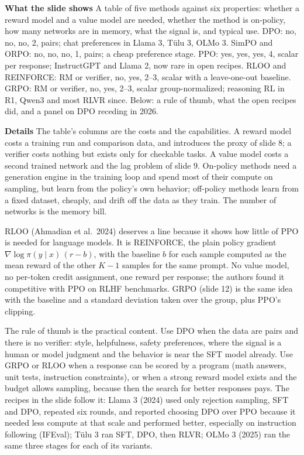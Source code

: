 \documentclass[11pt,letterpaper]{article}
\newcommand{\para}[1]{\medskip\noindent\textbf{#1}\quad}
\begin{document}
\para{What the slide shows} A table of five methods against six properties: whether a reward model and a value model are needed, whether the method is on-policy, how many networks are in memory, what the signal is, and typical use. DPO: no, no, no, 2, pairs; chat preferences in Llama 3, Tülu 3, OLMo 3. SimPO and ORPO: no, no, no, 1, pairs; a cheap preference stage. PPO: yes, yes, yes, 4, scalar per response; InstructGPT and Llama 2, now rare in open recipes. RLOO and REINFORCE: RM or verifier, no, yes, 2--3, scalar with a leave-one-out baseline. GRPO: RM or verifier, no, yes, 2--3, scalar group-normalized; reasoning RL in R1, Qwen3 and most RLVR since. Below: a rule of thumb, what the open recipes did, and a panel on DPO receding in 2026.

\para{Details} The table's columns are the costs and the capabilities. A reward model costs a training run and comparison data, and introduces the proxy of slide 8; a verifier costs nothing but exists only for checkable tasks. A value model costs a second trained network and the lag problem of slide 9. On-policy methods need a generation engine in the training loop and spend most of their compute on sampling, but learn from the policy's own behavior; off-policy methods learn from a fixed dataset, cheaply, and drift off the data as they train. The number of networks is the memory bill.

RLOO (Ahmadian et al.\ 2024) deserves a line because it shows how little of PPO is needed for language models. It is REINFORCE, the plain policy gradient $\nabla\log\pi(y\mid x)\,(r-b)$, with the baseline $b$ for each sample computed as the mean reward of the other $K-1$ samples for the same prompt. No value model, no per-token credit assignment, one reward per response; the authors found it competitive with PPO on RLHF benchmarks. GRPO (slide 12) is the same idea with the baseline and a standard deviation taken over the group, plus PPO's clipping.

The rule of thumb is the practical content. Use DPO when the data are pairs and there is no verifier: style, helpfulness, safety preferences, where the signal is a human or model judgment and the behavior is near the SFT model already. Use GRPO or RLOO when a response can be scored by a program (math answers, unit tests, instruction constraints), or when a strong reward model exists and the budget allows sampling, because then the search for better responses pays. The recipes in the slide follow it: Llama 3 (2024) used only rejection sampling, SFT and DPO, repeated six rounds, and reported choosing DPO over PPO because it needed less compute at that scale and performed better, especially on instruction following (IFEval); Tülu 3 ran SFT, DPO, then RLVR; OLMo 3 (2025) ran the same three stages for each of its variants.
\end{document}
